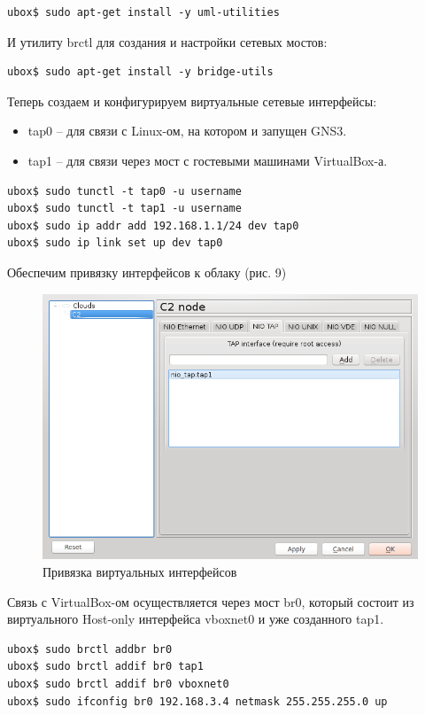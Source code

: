 \begin{Verbatim}[frame=single]
ubox$ sudo apt-get install -y uml-utilities
\end{Verbatim}

И утилиту brctl для создания и настройки сетевых мостов:
\begin{Verbatim}[frame=single]
ubox$ sudo apt-get install -y bridge-utils
\end{Verbatim}

Теперь создаем и конфигурируем виртуальные сетевые интерфейсы:
\begin{itemize}
\item tap0 -- для связи с Linux-ом, на котором и запущен GNS3.
\item tap1 -- для связи через мост с гостевыми машинами VirtualBox-а.
\end{itemize}
\begin{Verbatim}[frame=single]
ubox$ sudo tunctl -t tap0 -u username
ubox$ sudo tunctl -t tap1 -u username
ubox$ sudo ip addr add 192.168.1.1/24 dev tap0
ubox$ sudo ip link set up dev tap0
\end{Verbatim}

Обеспечим привязку интерфейсов к облаку (рис. 9)

\begin{figure}[h!]
\centering
\includegraphics[scale=0.85]{res/pic009}
\caption{Привязка виртуальных интерфейсов}
\end{figure}

Связь с VirtualBox-ом осуществляется через мост br0, который состоит из виртуального Host-only интерфейса vboxnet0 и уже созданного tap1.
\begin{Verbatim}[frame=single]
ubox$ sudo brctl addbr br0
ubox$ sudo brctl addif br0 tap1
ubox$ sudo brctl addif br0 vboxnet0
ubox$ sudo ifconfig br0 192.168.3.4 netmask 255.255.255.0 up
\end{Verbatim}

